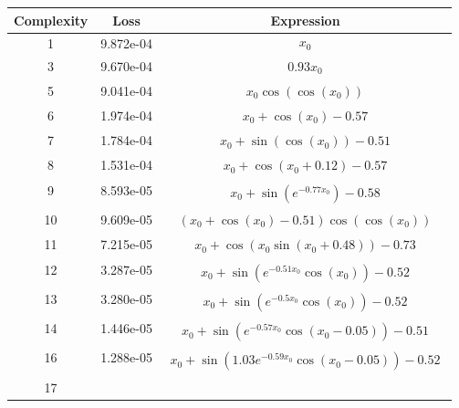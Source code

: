 \begin{center}
        \begin{tabular}{|c|c|c|}
        \hline
        Complexity & Loss & Expression \\
        \hline
        1 & 9.872e-04 & $\begin{aligned}x_{0}\end{aligned}$\\ \hline3 & 9.670e-04 & $\begin{aligned}0.93 x_{0}\end{aligned}$\\ \hline5 & 9.041e-04 & $\begin{aligned}x_{0} \cos{\left(\cos{\left(x_{0} \right)} \right)}\end{aligned}$\\ \hline6 & 1.974e-04 & $\begin{aligned}x_{0} + \cos{\left(x_{0} \right)} - 0.57\end{aligned}$\\ \hline7 & 1.784e-04 & $\begin{aligned}x_{0} + \sin{\left(\cos{\left(x_{0} \right)} \right)} - 0.51\end{aligned}$\\ \hline8 & 1.531e-04 & $\begin{aligned}x_{0} + \cos{\left(x_{0} + 0.12 \right)} - 0.57\end{aligned}$\\ \hline9 & 8.593e-05 & $\begin{aligned}x_{0} + \sin{\left(e^{- 0.77 x_{0}} \right)} - 0.58\end{aligned}$\\ \hline10 & 9.609e-05 & $\begin{aligned}\left(x_{0} + \cos{\left(x_{0} \right)} - 0.51\right) \cos{\left(\cos{\left(x_{0} \right)} \right)}\end{aligned}$\\ \hline11 & 7.215e-05 & $\begin{aligned}x_{0} + \cos{\left(x_{0} \sin{\left(x_{0} + 0.48 \right)} \right)} - 0.73\end{aligned}$\\ \hline12 & 3.287e-05 & $\begin{aligned}x_{0} + \sin{\left(e^{- 0.51 x_{0}} \cos{\left(x_{0} \right)} \right)} - 0.52\end{aligned}$\\ \hline13 & 3.280e-05 & $\begin{aligned}x_{0} + \sin{\left(e^{- 0.5 x_{0}} \cos{\left(x_{0} \right)} \right)} - 0.52\end{aligned}$\\ \hline14 & 1.446e-05 & $\begin{aligned}x_{0} + \sin{\left(e^{- 0.57 x_{0}} \cos{\left(x_{0} - 0.05 \right)} \right)} - 0.51\end{aligned}$\\ \hline16 & 1.288e-05 & $\begin{aligned}x_{0} + \sin{\left(1.03 e^{- 0.59 x_{0}} \cos{\left(x_{0} - 0.05 \right)} \right)} - 0.52\end{aligned}$\\ \hline17 & 
\end{tabular}
\end{center}
